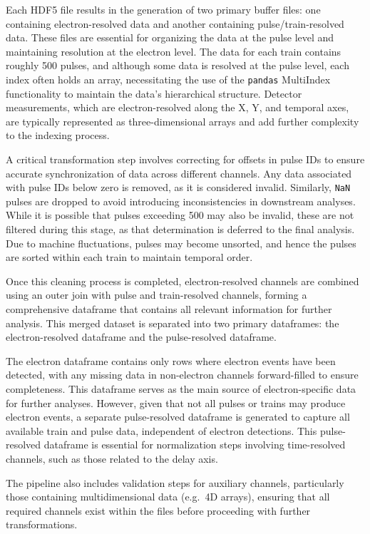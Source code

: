 Each HDF5 file results in the generation of two primary buffer files: one containing electron-resolved data and another containing pulse/train-resolved data. These files are essential for organizing the data at the pulse level and maintaining resolution at the electron level. The data for each train contains roughly 500 pulses, and although some data is resolved at the pulse level, each index often holds an array, necessitating the use of the \texttt{pandas} MultiIndex functionality to maintain the data’s hierarchical structure. Detector measurements, which are electron-resolved along the X, Y, and temporal axes, are typically represented as three-dimensional arrays and add further complexity to the indexing process.

A critical transformation step involves correcting for offsets in pulse IDs to ensure accurate synchronization of data across different channels. Any data associated with pulse IDs below zero is removed, as it is considered invalid. Similarly, \texttt{NaN} pulses are dropped to avoid introducing inconsistencies in downstream analyses. While it is possible that pulses exceeding 500 may also be invalid, these are not filtered during this stage, as that determination is deferred to the final analysis. Due to machine fluctuations, pulses may become unsorted, and hence the pulses are sorted within each train to maintain temporal order.

Once this cleaning process is completed, electron-resolved channels are combined using an outer join with pulse and train-resolved channels, forming a comprehensive dataframe that contains all relevant information for further analysis. This merged dataset is separated into two primary dataframes: the electron-resolved dataframe and the pulse-resolved dataframe.

The electron dataframe contains only rows where electron events have been detected, with any missing data in non-electron channels forward-filled to ensure completeness. This dataframe serves as the main source of electron-specific data for further analyses. However, given that not all pulses or trains may produce electron events, a separate pulse-resolved dataframe is generated to capture all available train and pulse data, independent of electron detections. This pulse-resolved dataframe is essential for normalization steps involving time-resolved channels, such as those related to the delay axis.

The pipeline also includes validation steps for auxiliary channels, particularly those containing multidimensional data (e.g.\ 4D arrays), ensuring that all required channels exist within the files before proceeding with further transformations.

